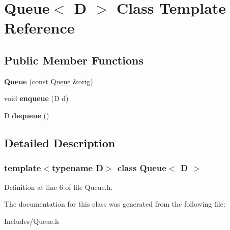 \hypertarget{class_queue}{}\section{Queue$<$ D $>$ Class Template Reference}
\label{class_queue}
\subsection*{Public Member Functions}
\begin{DoxyCompactItemize}
\item 
\mbox{\label{class_queue_a24f783b719e19d65b3ee5a98b6daee3a}} 
{\bfseries Queue} (const \hyperlink{class_queue}{Queue} \&orig)
\item 
\mbox{\label{class_queue_a80e37c5fc154e7a3788b6b25bb7399b8}} 
void {\bfseries enqueue} (D d)
\item 
\mbox{\label{class_queue_ae3a41c4439bb5914acce8ef329a05512}} 
D {\bfseries dequeue} ()
\end{DoxyCompactItemize}


\subsection{Detailed Description}
\subsubsection*{template$<$typename D$>$\newline
class Queue$<$ D $>$}



Definition at line 6 of file Queue.\+h.



The documentation for this class was generated from the following file\+:\begin{DoxyCompactItemize}
\item 
Includes/Queue.\+h\end{DoxyCompactItemize}
